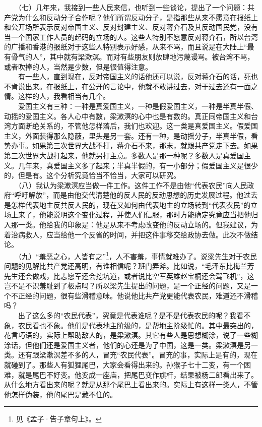 \documentclass[cn,11pt,chinese]{elegantbook}
\begin{document}
　　（七）几年来，我接到一些人民来信，也听到一些谈论，提出了一个问题：共产党为什么和反动分子合作呢？他们所谓反动分子，是指那些从来不愿意在报纸上和公开场所表示反对帝国主义、反对封建主义、反对蒋介石及其反动国民党，没有当一个国家工作人员的起码的立场的人。这些人特别不愿意反对蒋介石，所以台湾的广播和香港的报纸对于这些人特别表示好感，从来不骂，而且说是在大陆上“最有骨气的人”，其中就有梁漱溟。而对有些朋友则放肆地污蔑谩骂。被台湾不骂，或者吹捧的人，当然是少数，但是很值得注意。\\
　　有一些人，直到现在，反对帝国主义的话他还可以说，反对蒋介石的话，死也不肯说出来。在报纸上，在公开的言论中，他就不敢讲过去，对于过去还有一面之情。这样的人，我看相当有几个。\\
　　爱国主义有三种：一种是真爱国主义，一种是假爱国主义，一种是半真半假、动摇的爱国主义。各人心中有数，梁漱溟的心中也是有数的。真正同帝国主义和台湾方面断绝关系的，不管他怎样落后，我们也欢迎。这一类是真爱国主义。假爱国主义，外面装得那么隐蔽，里头是另一套。还有一种，是动摇分子，半真半假，看势办事。如果第三次世界大战不打，蒋介石不来，那末，就跟共产党走下去。如果第三次世界大战打起来，他就另打主意。多数人是那一种呢？多数人是真爱国主义。几年来，真爱国主义多了起来；半真半假的，有一小部分；假爱国主义是很少的，但是有。这个分析究竟恰当不恰当，大家可以研究。\\
　　（八）我认为梁漱溟应当做一件工作。这件工作不是由他“代表农民”向人民政府“呼吁解放”，而是由他交代清楚他的反人民的反动思想的历史发展过程。他过去是怎样代表地主反共反人民的，现在又如何由代表地主的立场转到“代表农民”的立场上来了，他能说明这个变化过程，并使人们信服，那时方能确定究竟应当把他归入那一类。他给我的印象是：他是从来不考虑改变他的反动立场的。但我建议，为着治病救人，应当给他一个反省的时间，并把这件事移交给政协去做。此次不做结论。\\
　　（九）“羞恶之心，人皆有之”\footnote[2]{ 见《孟子·告子章句上》。}，人不害羞，事情就难办了。说梁先生对于农民问题的见解比共产党还高明，有谁相信呢？班门弄斧。比如说，“毛泽东比梅兰芳先生还会做戏，比志愿军还会挖坑道，或者说比空军英雄赵宝桐还会驾飞机”，这岂不是不识羞耻到了极点吗？所以梁先生提出的问题，是一个正经的问题，又是一个不正经的问题，很有些滑稽意味。他说他比共产党更能代表农民，难道还不滑稽吗？\\
　　出了这么多的“农民代表”，究竟是代表谁呢？是不是代表农民的呢？我看不象，农民看也不象。他们是代表地主阶级的，是帮地主阶级忙的。其中最突出的，花言巧语的，实际上帮助敌人的，是梁漱溟。其它有些人是思想糊涂，说了一些糊涂话，但他们还是爱国主义者，他们的心还是为了中国，这是一类。梁漱溟是另一类。还有跟梁漱溟差不多的人，冒充“农民代表”。冒充的事，实际上是有的，现在就碰到了。那些人有狐狸尾巴，大家会看得出来的。孙猴子七十二变，有一个困难，就是尾巴不好变。他变成一座庙，把尾巴变作旗杆，结果被杨二郎看出来了。从什么地方看出来的呢？就是从那个尾巴上看出来的。实际上有这样一类人，不管他怎样伪装，他的尾巴是藏不住的。\\
\end{document}
